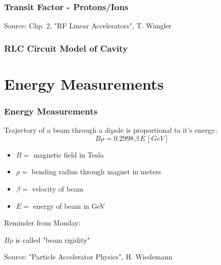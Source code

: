 \documentclass[professionalfonts,t]{beamer}
\begin{document}
\begin{frame}
\frametitle{Transit Factor - Protons/Ions}

\vspace{1em}
Source: Chp. 2, "RF Linear Accelerators", T. Wangler
\end{frame}

\begin{frame}
	\frametitle{RLC Circuit Model of Cavity}

	
\end{frame}



\section{Energy Measurements}
\begin{frame}
	\frametitle{Energy Measurements}
	Trajectory of a beam through a dipole is proportional to it's energy:
	\begin{equation}
		B \rho = 0.2998 \, \beta \, E \, [GeV]
	\end{equation}
	\begin{itemize}
		\item $B = $ magnetic field in Tesla
		\item $\rho =$ bending radius through magnet in meters
		\item $\beta =$ velocity of beam
		\item $E = $ energy of beam in GeV 
	\end{itemize}

\vspace{1em}
Reminder from Monday:

$B\rho$ is called "beam rigidity"

\vspace{1em}
Source: "Particle Accelerator Physics", H. Wiedemann
\end{frame}
\end{document}
